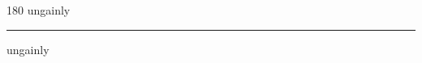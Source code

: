 
\begin{frame}
\begin{center}
\begin{turn}{180}
{\fontsize{2.5cm}{1em}\selectfont ungainly}
\end{turn}
\vspace{1em}\par  
\hrule
\vspace{1em}\par  
{\fontsize{2.5cm}{1em}\selectfont ungainly}
\end{center}
\end{frame}
